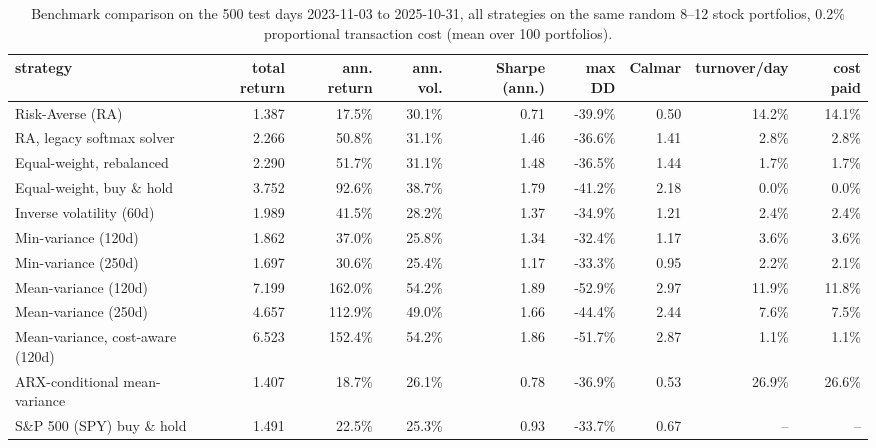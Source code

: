 \begin{table}[ht!]
\centering
\footnotesize
\setlength{\tabcolsep}{4pt}
\begin{tabular}{lrrrrrrrr}
\hline
strategy & total return & ann. return & ann. vol. & Sharpe (ann.) & max DD & Calmar & turnover/day & cost paid \\
\hline
Risk-Averse (RA) & 1.387 & 17.5\% & 30.1\% & 0.71 & -39.9\% & 0.50 & 14.2\% & 14.1\% \\
RA, legacy softmax solver & 2.266 & 50.8\% & 31.1\% & 1.46 & -36.6\% & 1.41 & 2.8\% & 2.8\% \\
Equal-weight, rebalanced & 2.290 & 51.7\% & 31.1\% & 1.48 & -36.5\% & 1.44 & 1.7\% & 1.7\% \\
Equal-weight, buy \& hold & 3.752 & 92.6\% & 38.7\% & 1.79 & -41.2\% & 2.18 & 0.0\% & 0.0\% \\
Inverse volatility (60d) & 1.989 & 41.5\% & 28.2\% & 1.37 & -34.9\% & 1.21 & 2.4\% & 2.4\% \\
Min-variance (120d) & 1.862 & 37.0\% & 25.8\% & 1.34 & -32.4\% & 1.17 & 3.6\% & 3.6\% \\
Min-variance (250d) & 1.697 & 30.6\% & 25.4\% & 1.17 & -33.3\% & 0.95 & 2.2\% & 2.1\% \\
Mean-variance (120d) & 7.199 & 162.0\% & 54.2\% & 1.89 & -52.9\% & 2.97 & 11.9\% & 11.8\% \\
Mean-variance (250d) & 4.657 & 112.9\% & 49.0\% & 1.66 & -44.4\% & 2.44 & 7.6\% & 7.5\% \\
Mean-variance, cost-aware (120d) & 6.523 & 152.4\% & 54.2\% & 1.86 & -51.7\% & 2.87 & 1.1\% & 1.1\% \\
ARX-conditional mean-variance & 1.407 & 18.7\% & 26.1\% & 0.78 & -36.9\% & 0.53 & 26.9\% & 26.6\% \\
S\&P 500 (SPY) buy \& hold & 1.491 & 22.5\% & 25.3\% & 0.93 & -33.7\% & 0.67 & -- & -- \\
\hline
\end{tabular}
\caption{Benchmark comparison on the 500 test days 2023-11-03 to 2025-10-31, all strategies on the same random 8--12 stock portfolios, 0.2\% proportional transaction cost (mean over 100 portfolios).}
\label{tab:bench_mean_covid}
\end{table}
